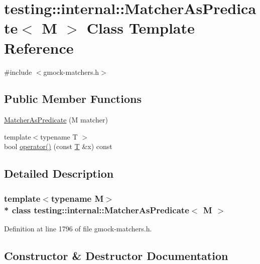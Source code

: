 \hypertarget{classtesting_1_1internal_1_1_matcher_as_predicate}{}\section{testing\+:\+:internal\+:\+:Matcher\+As\+Predicate$<$ M $>$ Class Template Reference}
\label{classtesting_1_1internal_1_1_matcher_as_predicate}


{\ttfamily \#include $<$gmock-\/matchers.\+h$>$}

\subsection*{Public Member Functions}
\begin{DoxyCompactItemize}
\item 
\hyperlink{classtesting_1_1internal_1_1_matcher_as_predicate_a2d8ad258929496dd3dea00fdb8ce3c8a}{Matcher\+As\+Predicate} (M matcher)
\item 
{\footnotesize template$<$typename T $>$ }\\bool \hyperlink{classtesting_1_1internal_1_1_matcher_as_predicate_ac6347406b1d2cc241a7f1b86e2bfc922}{operator()} (const \hyperlink{functions__7_8js_adf1f3edb9115acb0a1e04209b7a9937b}{T} \&x) const 
\end{DoxyCompactItemize}


\subsection{Detailed Description}
\subsubsection*{template$<$typename M$>$\\*
class testing\+::internal\+::\+Matcher\+As\+Predicate$<$ M $>$}



Definition at line 1796 of file gmock-\/matchers.\+h.



\subsection{Constructor \& Destructor Documentation}
